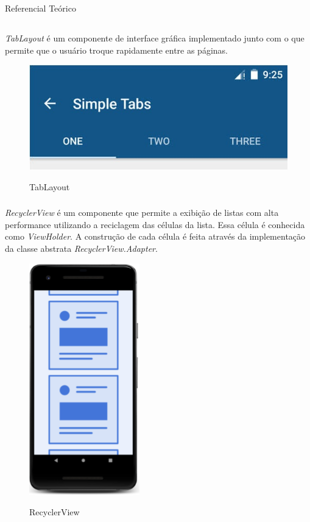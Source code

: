 \documentclass[
	12pt,				%
	openany,			%
	twoside,			%
	a4paper,			%
	english,			%
	french,				%
	spanish,			%
	brazil				%
	]{abntex2}
\begin{document}
\begin{chapter}{Referencial Teórico}
\subsection{} \label{TabLayout}
\textit{TabLayout} é um componente de interface gráfica  implementado junto com o  que permite que o usuário troque rapidamente entre as páginas.
\begin{figure}[h]
\centering
   \caption{TabLayout}
   \includegraphics[scale=0.5]{media/tabs.jpg}
     \label{fig:tabs}
\end{figure}

\subsubsection{} \label{RecyclerView}
\textit{RecyclerView} é um componente que permite a exibição de listas com alta performance utilizando a reciclagem das células da lista. Essa célula é conhecida como \textit{ViewHolder}. A construção de cada célula é feita através da implementação da classe abstrata \textit{RecyclerView.Adapter}.



\begin{figure}[h]
\centering
   \caption{RecyclerView}
   \includegraphics[scale=1.0]{media/recyclerview.png}
     \label{fig:recyclerview}
\end{figure}


\end{chapter}
\end{document}
